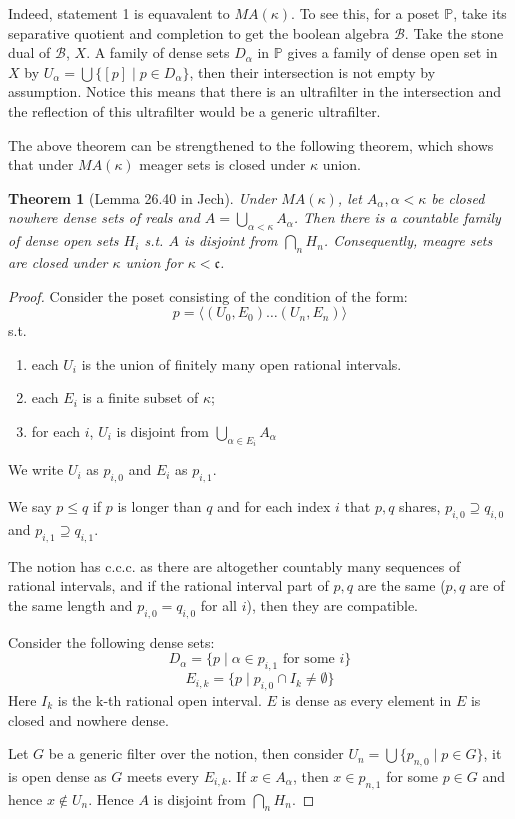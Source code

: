 \documentclass{article}
\newtheorem{theorem}{Theorem}
\newcommand{\bbP}{\mathbb{P}}
\begin{document}
Indeed, statement 1 is equavalent to $MA(\kappa)$. To see this, for a poset $\bbP$, take its separative quotient and completion to get the boolean algebra $\mathcal{B}$. Take the stone dual of $\mathcal{B}$, $X$. A family of dense sets $D_\alpha$ in $\bbP$ gives a family of dense open set in $X$ by $U_\alpha = \bigcup\{[p]\mid p\in D_\alpha\}$, then their intersection is not empty by assumption. Notice this means that there is an ultrafilter in the intersection and the reflection of this ultrafilter would be a generic ultrafilter.

The above theorem can be strengthened to the following theorem, which shows that under $MA(\kappa)$ meager sets is closed under $\kappa$ union.

\begin{theorem}[Lemma 26.40 in Jech]
    Under $MA(\kappa)$, let $A_\alpha,\alpha<\kappa$ be closed nowhere dense sets of reals and $A = \bigcup_{\alpha<\kappa}A_\alpha$. Then there is a countable family of dense open sets $H_i$ s.t. $A$ is disjoint from $\bigcap_n H_n$. Consequently, meagre sets are closed under $\kappa$ union for $\kappa<\mathfrak{c}$.
\end{theorem}

\begin{proof}
    Consider the poset consisting of the condition of the form:
    $$p = \langle (U_0,E_0)\dots (U_n,E_n)\rangle$$
    s.t. \begin{enumerate}
        \item each $U_i$ is the union of finitely many open rational intervals.
        \item each $E_i$ is a finite subset of $\kappa$;
        \item for each $i$, $U_i$ is disjoint from $\bigcup_{\alpha\in E_i}A_\alpha$
    \end{enumerate}
    We write $U_i$ as $p_{i,0}$ and $E_i$ as $p_{i,1}$.

    We say $p\leq q$ if $p$ is longer than $q$ and for each index $i$ that $p,q$ shares, $p_{i,0}\supseteq q_{i,0}$ and $p_{i,1}\supseteq q_{i,1}$.

    The notion has c.c.c. as there are altogether countably many sequences of rational intervals, and if the rational interval part of $p,q$ are the same ($p,q$ are of the same length and $p_{i,0} = q_{i,0}$ for all $i$), then they are compatible.

    Consider the following dense sets:
    $$D_\alpha = \{p\mid \alpha\in p_{i,1}\text{ for some }i\}$$
    $$E_{i,k} = \{p\mid p_{i,0}\cap I_k \neq \emptyset\}$$
    Here $I_k$ is the k-th rational open interval. $E$ is dense as every element in $E$ is closed and nowhere dense.

    Let $G$ be a generic filter over the notion, then consider $U_n = \bigcup\{p_{n,0}\mid p\in G\}$, it is open dense as $G$ meets every $E_{i,k}$. If $x\in A_\alpha$, then $x\in p_{n,1}$ for some $p\in G$ and hence $x\not\in U_n$. Hence $A$ is disjoint from $\bigcap_{n}H_n$.
    
\end{proof}
\end{document}

